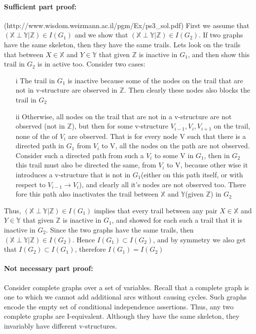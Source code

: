\documentclass[twoside]{article}
\begin{document}
\begin{itemize}
\paragraph{Sufficient part proof:} (http://www.wisdom.weizmann.ac.il/pgm/Ex/ps3\_sol.pdf) First we assume that $(\mathbb{X} \perp \mathbb{Y}|\mathbb{Z})\in I(G_1)$ and we show that $(\mathbb{X} \perp \mathbb{Y}|\mathbb{Z})\in I(G_2)$. If two graphs have the same skeleton, then they have the same trails. Lets look on the trails that between $X\in \mathbb{X}$ and $Y\in \mathbb{Y}$ that given $\mathbb{Z}$ is inactive in $G_1$, and then show this trail in $G_2$ is in active too. Consider two cases:
\begin{itemize}
\item[i] The trail in $G_1$ is inactive because some of the nodes on the trail that are not in v-structure are observed in $\mathbb{Z}$. Then clearly these nodes also blocks the trail in $G_2$
\item[ii] Otherwise, all nodes on the trail that are not in a v-structure are not observed (not in $\mathbb{Z}$), but then for some v-structure $V_{i-1},V_i,V_{i+1}$ on the trail, none of the  of $V_i$ are observed. That is for every node V such that there is a directed path in $G_1$ from $V_i$ to V, all the nodes on the path are not observed. Consider such a directed path from such a $V_i$ to some V in $G_1$, then in $G_2$ this trail must also be directed the same, from $V_i$ to V, because other wise it introduces a v-structure that is not in $G_1$(either on this path itself, or with respect to $V_{i-1}\rightarrow V_i$), and clearly all it's nodes are not observed too. There fore this path also inactivates the trail between $\mathbb{X}$ and $\mathbb{Y}$(given $\mathbb{Z}$) in $G_2$ 
\end{itemize}  
Thus, $(\mathbb{X} \perp \mathbb{Y}|\mathbb{Z})\in I(G_1)$ implies that every trail between any pair $X\in \mathbb{X}$ and $Y\in \mathbb{Y}$ that given $\mathbb{Z}$ is inactive in $G_1$, and showed for each such a trail that it is inactive in $G_2$. Since the two graphs have the same trails, then $(\mathbb{X} \perp \mathbb{Y}|\mathbb{Z})\in I(G_2)$. Hence $I(G_1)\subset I(G_2)$, and by symmetry we also get that $I(G_2)\subset I(G_1)$, therefore $I(G_1) = I(G_2)$




\paragraph{Not necessary part proof:} Consider complete graphs over a set of variables. Recall that a complete graph is one to which we cannot add additional arcs without causing cycles. Such graphs encode the empty set of conditional independence assertions. Thus, any two complete graphs are I-equivalent. Although they have the same skeleton, they invariably have different v-structures. 
\end{itemize}
\end{document}
